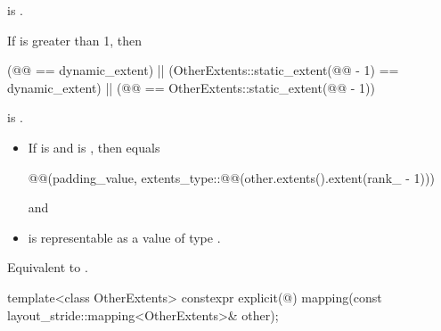 \begin{itemdescr}
\pnum
\constraints
{} is .

\pnum
\mandates
If  is greater than 1, then
\begin{codeblock}
(@@ == dynamic_extent) ||
(OtherExtents::static_extent(@@ - 1) == dynamic_extent) ||
(@@ == OtherExtents::static_extent(@@ - 1))
\end{codeblock}
is .

\pnum
\expects
\begin{itemize}
\item
If  is  and
 is , then
 equals
\begin{codeblock}
@@(padding_value,
                        extents_type::@@(other.extents().extent(rank_ - 1)))
\end{codeblock}
and
\item
{} is representable as
a value of type .
\end{itemize}

\pnum
\effects
Equivalent to .
\end{itemdescr}

%
\begin{itemdecl}
template<class OtherExtents>
  constexpr explicit(@\seebelow@)
    mapping(const layout_stride::mapping<OtherExtents>& other);
\end{itemdecl}

